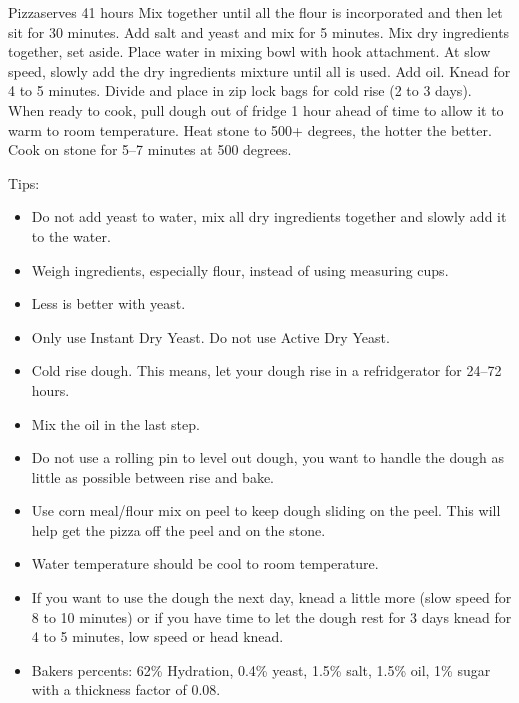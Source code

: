 
\begin{recipe}{Pizza}{serves 4}{1 hours}
  Mix together until all the flour is incorporated and then let sit for 30 minutes.
  Add salt and yeast and mix for 5 minutes.
  Mix dry ingredients together, set aside.  Place water in mixing bowl with hook attachment.  At slow speed, slowly add the dry ingredients mixture until all is used.  Add oil.  Knead for 4 to 5 minutes.  Divide and place in zip lock bags for cold rise (2 to 3 days).  When ready to cook, pull dough out of fridge 1 hour ahead of time to allow it to warm to room temperature.  Heat stone to 500+ degrees, the hotter the better.
  Cook on stone for 5--7 minutes at 500 degrees.
\end{recipe}

Tips:
\begin{itemize}
  \item Do not add yeast to water, mix all dry ingredients together and slowly add it to the water.
  \item Weigh ingredients, especially flour, instead of using measuring cups.
  \item Less is better with yeast.
  \item Only use Instant Dry Yeast.  Do not use Active Dry Yeast.
  \item Cold rise dough.  This means, let your dough rise in a refridgerator for 24--72 hours.
  \item Mix the oil in the last step.
  \item Do not use a rolling pin to level out dough, you want to handle the dough as little as possible between rise and bake.
  \item Use corn meal/flour mix on peel to keep dough sliding on the peel.  This will help get the pizza off the peel and on the stone.
  \item Water temperature should be cool to room temperature.
  \item If you want to use the dough the next day, knead a little more (slow speed for 8 to 10 minutes) or if you have time to let the dough rest for 3 days knead for 4 to 5 minutes, low speed or head knead.
  \item Bakers percents: 62\% Hydration, 0.4\% yeast, 1.5\% salt, 1.5\% oil, 1\% sugar with a thickness factor of 0.08.
\end{itemize}

